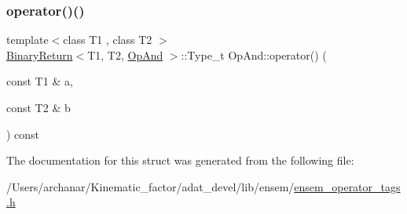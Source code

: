 \mbox{\label{structOpAnd_a27c9f5545b8961284cc388628ac2f9bb}} 
\subsubsection{\texorpdfstring{operator()()}{operator()()}\hspace{0.1cm}{\footnotesize\ttfamily [2/2]}}
{\footnotesize\ttfamily template$<$class T1 , class T2 $>$ \\
\mbox{\hyperlink{structBinaryReturn}{Binary\+Return}}$<$T1, T2, \mbox{\hyperlink{structOpAnd}{Op\+And}} $>$\+::Type\+\_\+t Op\+And\+::operator() (\begin{DoxyParamCaption}\item[{const T1 \&}]{a,  }\item[{const T2 \&}]{b }\end{DoxyParamCaption}) const\hspace{0.3cm}{\ttfamily [inline]}}



The documentation for this struct was generated from the following file\+:\begin{DoxyCompactItemize}
\item 
/\+Users/archanar/\+Kinematic\+\_\+factor/adat\+\_\+devel/lib/ensem/\mbox{\hyperlink{lib_2ensem_2ensem__operator__tags_8h}{ensem\+\_\+operator\+\_\+tags.\+h}}\end{DoxyCompactItemize}
